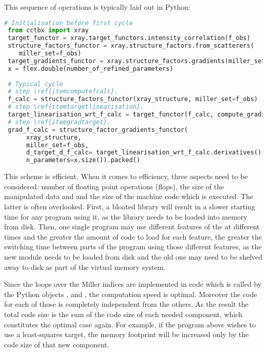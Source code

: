 \documentclass[12pt]{article}
\begin{document}
This sequence of operations is typically laid out in Python:

 \begin{lstlisting}[language=Python]
 # Initialisation before first cycle
 from cctbx import xray
 target_functor = xray.target_functors.intensity_correlation(f_obs)
 structure_factors_functor = xray.structure_factors.from_scatterers(
 	miller_set=f_obs)
 target_gradients_functor = xray.structure_factors.gradients(miller_set=f_obs)
 x = flex.double(number_of_refined_parameters)
 
 # Typical cycle
 # step \ref{itemcomputefcalc}.
 f_calc = structure_factors_functor(xray_structure, miller_set=f_obs)
 # step \ref{itemtargetlinearisation}.
 target_linearisation_wrt_f_calc = target_functor(f_calc, compute_gradients=True)
 # step \ref{itemgradtarget}.
 grad_f_calc = structure_factor_gradients_functor(
      xray_structure,
      miller_set=f_obs,
      d_target_d_f_calc= target_linearisation_wrt_f_calc.derivatives(),
      n_parameters=x.size()).packed() 
 \end{lstlisting}
 
 This scheme is efficient. When it comes to efficiency, three aspects need to be considered:
 number of floating point operations (flops), the size of the manipulated data and and the size of the machine code which is executed. The latter is often overlooked. First, a bloated library will result in a slower starting time for any program using it, as the library needs to be loaded into memory from disk. Then, one single program may use different features of the \cctbx at different times and the greater the amount of code to load for each feature, the greater the switching time between parts of the program using those different features, as the new module needs to be loaded from disk and the old one may need to be shelved away to disk as part of the virtual memory system.
 
 Since the loops over the Miller indices are implemented in \cpp code which is called by the Python objects ,  and , the computation speed is optimal. Moreover the \cpp code for each of those is completely independent from the others. As the result the total code size is the sum of the code size of each needed component, which constitutes the optimal case again. For example, if the program above wishes to use a least-squares target, the memory footprint will be increased only by the code size of that new component.
 
\end{document}

